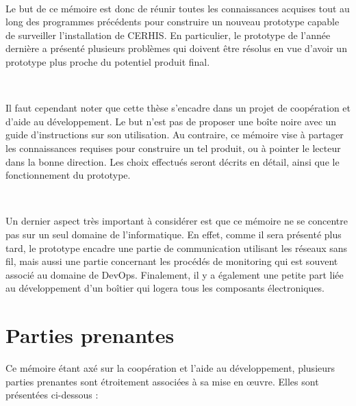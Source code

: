 ~

\noindent
Le but de ce mémoire est donc de réunir toutes les connaissances acquises tout au long des programmes précédents pour construire un nouveau prototype capable de surveiller l'installation de CERHIS.  En particulier, le prototype de l'année dernière a présenté plusieurs problèmes qui doivent être résolus en vue d'avoir un prototype plus proche du potentiel produit final.

~

\noindent
Il faut cependant noter que cette thèse s'encadre dans un projet de coopération et d'aide au développement. Le but n'est pas de proposer une boîte noire avec un guide d'instructions sur son utilisation. Au contraire, ce mémoire vise à partager les connaissances requises pour construire un tel produit, ou à pointer le lecteur dans la bonne direction. Les choix effectués seront décrits en détail, ainsi que le fonctionnement du prototype.

~

\noindent
Un dernier aspect très important à considérer est que ce mémoire ne se concentre pas sur un seul domaine de l'informatique. En effet, comme il sera présenté plus tard, le prototype encadre une partie de communication utilisant les réseaux sans fil, mais aussi une partie concernant les procédés de monitoring qui est souvent associé au domaine de DevOps. Finalement, il y a également une petite part liée au développement d'un boîtier qui logera tous les composants électroniques.


\section{Parties prenantes}

\noindent
Ce mémoire étant axé sur la coopération et l'aide au développement, plusieurs parties prenantes sont étroitement associées à sa mise en œuvre. Elles sont présentées ci-dessous :

~

